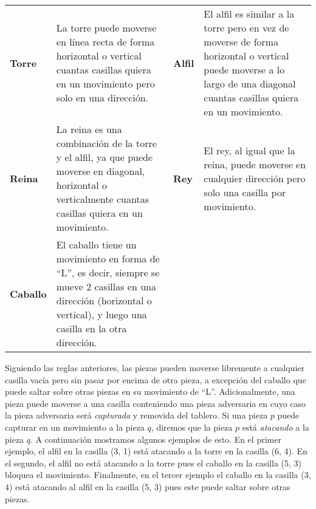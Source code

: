 \documentclass{oci}
\begin{document}
\begin{problemDescription}
\newcommand{\boardsmall}[1][]{\scalebox{0.75}{\chessboard[#1]}}
\newcommand{\vadj}{\vspace{0em}}
\def\arraystretch{1.5}
\setlength{\tabcolsep}{0em}
\begin{tabularx}{\textwidth}[t]{AB@{\hspace{.03\textwidth}}AB}
  \textbf{Torre}
  \boardsmall[setpieces={rc3}, markfields={c1,c2,c4,c5,a3,b3,d3,e3}]
  &
  \vadj
  La torre puede moverse en línea recta de forma horizontal o vertical cuantas casillas quiera en
  un movimiento pero solo en una dirección.

  &
  \textbf{Alfil}

  \boardsmall[setpieces={bc3}, markfields={a1,b2,d4,e5,a5,b4,d2,e1}]
  &
  \vadj
  El alfil es similar a la torre pero en vez de moverse de forma horizontal o vertical
  puede moverse a lo largo de una diagonal cuantas casillas quiera en un movimiento.
  \\

  \textbf{Reina}
  \boardsmall[setpieces={qc3}, markfields={a1,b2,d4,e5,a5,b4,d2,e1,c1,c2,c4,c5,a3,b3,d3,e3}]
  &
  \vspace{0.1em}
  La reina es una combinación de la torre y el alfil, ya que puede moverse en diagonal,
  horizontal o verticalmente cuantas casillas quiera en un movimiento.

  &
  \textbf{Rey}
  \boardsmall[setpieces={kc3}, markfields={b2,d4,b4,d2,c2,c4,b3,d3}]
  &
  \vspace{0.2em}
  El rey, al igual que la reina, puede moverse en cualquier dirección pero solo una casilla por
  movimiento.
  \\

  \textbf{Caballo}
  \boardsmall[setpieces={nc3}, markfields={a4,a2,b5,b1,d5,d1,e4,e2}]
  &
  \vspace{0.1em}
  El caballo tiene un movimiento en forma de ``L'', es decir, siempre se mueve
  2 casillas en una dirección (horizontal o vertical), y luego una casilla en la otra dirección.
\end{tabularx}

Siguiendo las reglas anteriores, las piezas pueden moverse libremente a cualquier casilla vacía
pero sin pasar por encima de otra pieza, a excepción del caballo que puede saltar sobre otras
piezas en su movimiento de ``L''.
Adicionalmente, una pieza puede moverse a una casilla conteniendo una pieza adversaria en cuyo
caso la pieza adversaria será \emph{capturada} y removida del tablero.
Si una pieza $p$ puede capturar en un movimiento a la pieza $q$,
diremos que la pieza $p$ está \emph{atacando} a la pieza $q$.
A continuación mostramos algunos ejemplos de esto.
En el primer ejemplo, el alfil en la casilla (3, 1) está atacando a la torre en la casilla (6, 4).
En el segundo, el alfil no está atacando a la torre pues el caballo en la casilla (5, 3)
bloquea el movimiento.
Finalmente, en el tercer ejemplo el caballo en la casilla (3, 4) está atacando al alfil
en la casilla (5, 3) pues este puede saltar sobre otras piezas.


\end{problemDescription}
\end{document}
